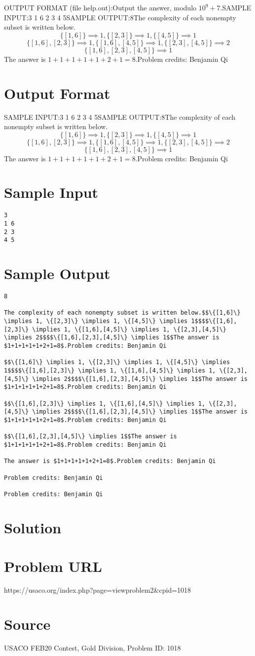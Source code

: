 \documentclass[12pt]{article}
\begin{document}
OUTPUT FORMAT (file help.out):Output the answer, modulo $10^9+7$.SAMPLE INPUT:3
1 6
2 3
4 5SAMPLE OUTPUT:8The complexity of each nonempty subset is written below.$$\{[1,6]\} \implies 1, \{[2,3]\} \implies 1, \{[4,5]\} \implies 1$$$$\{[1,6],[2,3]\} \implies 1, \{[1,6],[4,5]\} \implies 1, \{[2,3],[4,5]\} \implies 2$$$$\{[1,6],[2,3],[4,5]\} \implies 1$$The answer is $1+1+1+1+1+2+1=8$.Problem credits: Benjamin Qi

\section*{Output Format}
SAMPLE INPUT:3
1 6
2 3
4 5SAMPLE OUTPUT:8The complexity of each nonempty subset is written below.$$\{[1,6]\} \implies 1, \{[2,3]\} \implies 1, \{[4,5]\} \implies 1$$$$\{[1,6],[2,3]\} \implies 1, \{[1,6],[4,5]\} \implies 1, \{[2,3],[4,5]\} \implies 2$$$$\{[1,6],[2,3],[4,5]\} \implies 1$$The answer is $1+1+1+1+1+2+1=8$.Problem credits: Benjamin Qi

\section*{Sample Input}
\begin{verbatim}
3
1 6
2 3
4 5
\end{verbatim}

\section*{Sample Output}
\begin{verbatim}
8

The complexity of each nonempty subset is written below.$$\{[1,6]\} \implies 1, \{[2,3]\} \implies 1, \{[4,5]\} \implies 1$$$$\{[1,6],[2,3]\} \implies 1, \{[1,6],[4,5]\} \implies 1, \{[2,3],[4,5]\} \implies 2$$$$\{[1,6],[2,3],[4,5]\} \implies 1$$The answer is $1+1+1+1+1+2+1=8$.Problem credits: Benjamin Qi

$$\{[1,6]\} \implies 1, \{[2,3]\} \implies 1, \{[4,5]\} \implies 1$$$$\{[1,6],[2,3]\} \implies 1, \{[1,6],[4,5]\} \implies 1, \{[2,3],[4,5]\} \implies 2$$$$\{[1,6],[2,3],[4,5]\} \implies 1$$The answer is $1+1+1+1+1+2+1=8$.Problem credits: Benjamin Qi

$$\{[1,6],[2,3]\} \implies 1, \{[1,6],[4,5]\} \implies 1, \{[2,3],[4,5]\} \implies 2$$$$\{[1,6],[2,3],[4,5]\} \implies 1$$The answer is $1+1+1+1+1+2+1=8$.Problem credits: Benjamin Qi

$$\{[1,6],[2,3],[4,5]\} \implies 1$$The answer is $1+1+1+1+1+2+1=8$.Problem credits: Benjamin Qi

The answer is $1+1+1+1+1+2+1=8$.Problem credits: Benjamin Qi

Problem credits: Benjamin Qi

Problem credits: Benjamin Qi
\end{verbatim}

\section*{Solution}


\section*{Problem URL}
https://usaco.org/index.php?page=viewproblem2&cpid=1018

\section*{Source}
USACO FEB20 Contest, Gold Division, Problem ID: 1018
\end{document}
